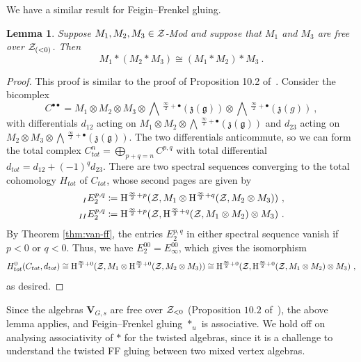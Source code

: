 \documentclass[a4paper]{article}
\newtheorem{lem}[thm]{Lemma}
\def\ZZ{{\cal Z}}
\def\gf{\mathfrak{g}}
\newcommand{\Hi}[1]{\mathrm{H}^{\frac{\infty}{2}+#1}}
\newcommand{\Li}[1]{\mathrm{\bigwedge}\,^{\frac{\infty}{2}+#1}}
\def\V{\mathbf{V}}
\begin{document}
We have a similar result for Feigin--Frenkel gluing.
\begin{lem}\label{lem:rearr_ff}
Suppose $M_1,M_2,M_3\in\ZZ$-Mod and suppose that $M_1$ and $M_3$ are free over $\ZZ_{(<0)}$. Then
\begin{equation*}
	M_1\ast (M_2\ast M_3)\cong (M_1\ast M_2)\ast M_3~.
\end{equation*}
\end{lem}
\begin{proof}
This proof is similar to the proof of Proposition 10.2 of~\cite{Arakawa:2018egx}. Consider the bicomplex
\begin{equation*}
	C^{\bullet\bullet} = M_1\otimes M_2\otimes M_3 \otimes \Li{\bullet}(\mathfrak{z}(\gf))\otimes\Li{\bullet}(\mathfrak{z}(g))~,
\end{equation*}
with differentials $d_{12}$ acting on $M_1\otimes M_2 \otimes \Li{\bullet}(\mathfrak{z}(\gf))$ and $d_{23}$ acting on $M_2\otimes M_3\otimes \Li{\bullet}(\mathfrak{z}(\gf))$. The two differentials anticommute, so we can form the total complex $C_{tot}^n = \bigoplus_{p+q=n}C^{p,q}$ with total differential $d_{tot} = d_{12}+(-1)^q d_{23}$. There are two spectral sequences converging to the total cohomology $H_{tot}$ of $C_{tot}$, whose second pages are given by
\begin{equation}\nonumber
	\begin{split}
	_{I} E_2^{p,q} \coloneqq \Hi{p}(\ZZ,M_1\otimes\Hi{q}(\ZZ,M_2\otimes M_3))~,\\
	_{II} E_2^{p,q} \coloneqq \Hi{p}(\ZZ,\Hi{q}(\ZZ,M_1\otimes M_2)\otimes M_3)~.
	\end{split}
\end{equation}
By Theorem \ref{thm:van-ff}, the entries $E^{p,q}_2$ in either spectral sequence vanish if $p<0$ or $q<0$. Thus, we have $E_2^{00}=E_\infty^{00}$, which gives the isomorphism
\begin{equation*}
	H^0_{tot}(C_{tot},d_{tot}) \cong \Hi{0}(\ZZ,M_1\otimes\Hi{0}(\ZZ,M_2\otimes M_3))\cong\Hi{0}(\ZZ,\Hi{0}(\ZZ,M_1\otimes M_2)\otimes M_3)~,
\end{equation*}
as desired.
\end{proof}
\vspace{-6pt}

Since the algebras $\V_{G,s}$ are free over $\ZZ_{<0}$ (Proposition $10.2$ of~\cite{Arakawa:2018egx}), the above lemma applies, and Feigin--Frenkel gluing $*_u$ is associative. We hold off on analysing associativity of $\ast$ for the twisted algebras, since it is a challenge to understand the twisted FF gluing between two mixed vertex algebras.
\end{document}
